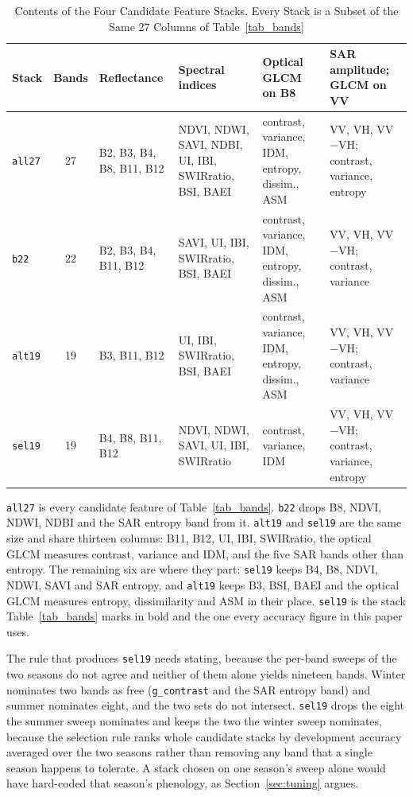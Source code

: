 \documentclass[conference]{IEEEtran}
\begin{document}
\begin{table}[!t]
\caption{Contents of the Four Candidate Feature Stacks. Every Stack is a Subset of the Same 27 Columns of Table~\ref{tab_bands}}
\label{tab_stackdef}
\begin{center}
\setlength{\tabcolsep}{4pt}
\begin{tabular}{@{}lcL{2.3cm}L{4.3cm}L{3.7cm}L{4.0cm}@{}}
\toprule
\textbf{Stack} & \textbf{Bands} & \textbf{Reflectance} & \textbf{Spectral indices} & \textbf{Optical GLCM on B8} & \textbf{SAR amplitude; GLCM on VV} \\
\midrule
\texttt{all27} & 27 & B2, B3, B4, B8, B11, B12 & NDVI, NDWI, SAVI, NDBI, UI, IBI, SWIRratio, BSI, BAEI & contrast, variance, IDM, entropy, dissim., ASM & VV, VH, VV$-$VH; contrast, variance, entropy \\
\addlinespace[2pt]
\texttt{b22}   & 22 & B2, B3, B4, B11, B12 & SAVI, UI, IBI, SWIRratio, BSI, BAEI & contrast, variance, IDM, entropy, dissim., ASM & VV, VH, VV$-$VH; contrast, variance \\
\addlinespace[2pt]
\texttt{alt19} & 19 & B3, B11, B12 & UI, IBI, SWIRratio, BSI, BAEI & contrast, variance, IDM, entropy, dissim., ASM & VV, VH, VV$-$VH; contrast, variance \\
\addlinespace[2pt]
\texttt{sel19} & 19 & B4, B8, B11, B12 & NDVI, NDWI, SAVI, UI, IBI, SWIRratio & contrast, variance, IDM & VV, VH, VV$-$VH; contrast, variance, entropy \\
\bottomrule
\end{tabular}

\vspace{2pt}
\parbox{\textwidth}{\footnotesize \texttt{all27} is every candidate feature of Table~\ref{tab_bands}. \texttt{b22} drops B8, NDVI, NDWI, NDBI and the SAR entropy band from it. \texttt{alt19} and \texttt{sel19} are the same size and share thirteen columns: B11, B12, UI, IBI, SWIRratio, the optical GLCM measures contrast, variance and IDM, and the five SAR bands other than entropy. The remaining six are where they part: \texttt{sel19} keeps B4, B8, NDVI, NDWI, SAVI and SAR entropy, and \texttt{alt19} keeps B3, BSI, BAEI and the optical GLCM measures entropy, dissimilarity and ASM in their place. \texttt{sel19} is the stack Table~\ref{tab_bands} marks in bold and the one every accuracy figure in this paper uses.}
\end{center}
\end{table}


The rule that produces \texttt{sel19} needs stating, because the per-band sweeps of the two seasons do not agree and neither of them alone yields nineteen bands. Winter nominates two bands as free (\texttt{g\_contrast} and the SAR entropy band) and summer nominates eight, and the two sets do not intersect. \texttt{sel19} drops the eight the summer sweep nominates and keeps the two the winter sweep nominates, because the selection rule ranks whole candidate stacks by development accuracy averaged over the two seasons rather than removing any band that a single season happens to tolerate. A stack chosen on one season's sweep alone would have hard-coded that season's phenology, as Section~\ref{sec:tuning} argues.
\end{document}
